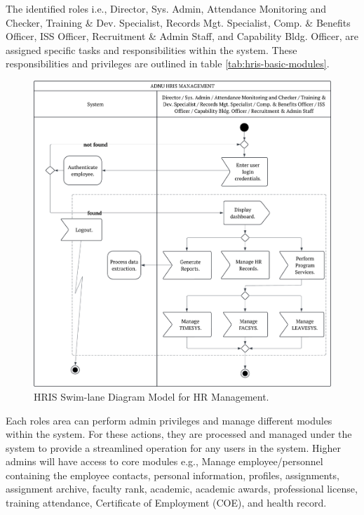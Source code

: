     The identified roles i.e., Director, Sys. Admin, Attendance Monitoring and Checker, Training \& Dev. Specialist, Records Mgt. Specialist, Comp. \& Benefits Officer, ISS Officer, Recruitment \& Admin Staff, and Capability Bldg. Officer, are assigned specific tasks and responsibilities within the system. These responsibilities and privileges are outlined in table \ref*{tab:hris-basic-modules}. 

    \begin{figure}[H]
        \centering
        \includegraphics[width=1\linewidth]{figures/images/swimlane-admins.png}
        \caption{HRIS Swim-lane Diagram Model for HR Management.}
        \label{fig:swimlane-admins}
    \end{figure}

    Each roles area can perform admin privileges and manage different modules within the system. For these actions, they are processed and managed under the system to provide a streamlined operation for any users in the system. Higher admins will have access to core modules e.g., Manage employee/personnel containing the employee contacts, personal information, profiles, assignments, assignment archive, faculty rank, academic, academic awards, professional license, training attendance, Certificate of Employment (COE), and health record.

